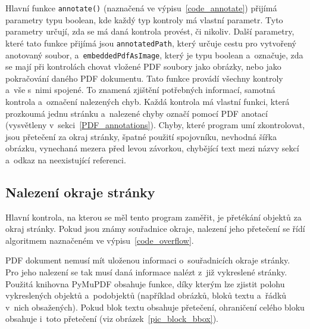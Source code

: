 Hlavní funkce \texttt{annotate()} (naznačená ve výpisu~\ref{code_annotate}) přijímá parametry typu boolean, kde
každý typ kontroly má vlastní parametr. Tyto parametry určují, zda se má daná
kontrola provést, či nikoliv. Další parametry, které tato funkce přijímá jsou
\texttt{annotatedPath}, který určuje cestu pro vytvořený anotovaný soubor,
a~\texttt{embeddedPdfAsImage}, který je typu boolean a~označuje, zda se mají
při kontrolách chovat vložené PDF soubory jako obrázky, nebo jako pokračování
daného PDF dokumentu. Tato funkce provádí všechny kontroly a~vše s~nimi spojené.
To znamená zjištění potřebných informací, samotná kontrola a~označení nalezených
chyb. Každá kontrola má vlastní funkci, která prozkoumá jednu stránku a~nalezené
chyby označí pomocí PDF anotací (vysvětleny v~sekci~\ref{PDF_annotations}).
Chyby, které program umí zkontrolovat, jsou přetečení za okraj stránky, 
špatné použití spojovníku, nevhodná šířka obrázku, vynechaná mezera před levou
závorkou, chybějící text mezi názvy sekcí a~odkaz na neexistující referenci.

\noindent\begin{minipage}{\linewidth}
    \hfill
    
\end{minipage}


\subsection*{Nalezení okraje stránky}
Hlavní kontrola, na kterou se měl tento program zaměřit, je přetékání objektů za
okraj stránky. Pokud jsou známy souřadnice okraje, nalezení jeho přetečení
se řídí algoritmem naznačeném ve výpisu~\ref{code_overflow}.

\noindent\begin{minipage}{\linewidth}
    \hfill
    
\end{minipage}

PDF dokument nemusí mít uloženou informaci o~souřadnicích okraje stránky. Pro
jeho nalezení se tak musí daná informace nalézt z~již vykreslené stránky.
Použitá knihovna PyMuPDF obsahuje funkce, díky kterým lze zjistit polohu
vykreslených objektů a~podobjektů (například obrázků, bloků textu a~řádků v~nich
obsažených). Pokud blok textu obsahuje přetečení, ohraničení celého bloku
obsahuje i~toto přetečení (viz obrázek~\ref{pic_block_bbox}).

